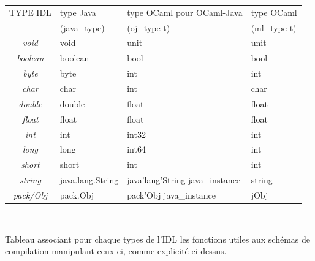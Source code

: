 \documentclass[a4paper, 11pt, notitlepage]{article}
\begin{document}
\begin{tabular}{|c|l|l|l|}
 \hline
TYPE IDL &type Java & type OCaml  pour OCaml-Java & type OCaml \\
& (java\_type) & (oj\_type t) & (ml\_type t) \\
 \hline
\emph{void} & void & unit & unit\\
\emph{boolean} &boolean & bool & bool\\
\emph{byte} & byte & int & int \\
\emph{char} &char & int & char\\
\emph{double} & double & float & float\\
\emph{float} & float & float & float\\
\emph{int} & int & int32 & int\\
\emph{long} & long & int64 & int\\
\emph{short} & short & int & int\\
\emph{string} & java.lang.String & java'lang'String java\_instance & string\\
\emph{pack/Obj} & pack.Obj & pack'Obj java\_instance & jObj\\
 \hline
\end{tabular}
\
\newline

Tableau associant pour chaque types de l'IDL les
fonctions utiles aux schémas de compilation manipulant ceux-ci, comme explicité ci-dessus. 
\end{document}
